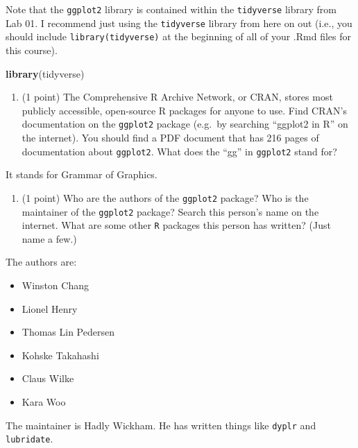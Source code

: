 \documentclass[]{article}
\newenvironment{Shaded}{\begin{snugshade}}{\end{snugshade}}
\newcommand{\KeywordTok}[1]{\textcolor[rgb]{0.13,0.29,0.53}{\textbf{#1}}}
\newcommand{\NormalTok}[1]{#1}
\providecommand{\tightlist}{%
  \setlength{\itemsep}{0pt}\setlength{\parskip}{0pt}}
\begin{document}
Note that the \texttt{ggplot2} library is contained within the
\texttt{tidyverse} library from Lab 01. I recommend just using the
\texttt{tidyverse} library from here on out (i.e., you should include
\texttt{library(tidyverse)} at the beginning of all of your .Rmd files
for this course).

\begin{Shaded}
\begin{Highlighting}[]
\KeywordTok{library}\NormalTok{(tidyverse)}
\end{Highlighting}
\end{Shaded}

\begin{enumerate}
\def\labelenumi{\alph{enumi}.}
\setcounter{enumi}{1}
\tightlist
\item
  (1 point) The Comprehensive R Archive Network, or CRAN, stores most
  publicly accessible, open-source R packages for anyone to use. Find
  CRAN's documentation on the \texttt{ggplot2} package (e.g.~by
  searching ``ggplot2 in R'' on the internet). You should find a PDF
  document that has 216 pages of documentation about \texttt{ggplot2}.
  What does the ``gg'' in \texttt{ggplot2} stand for?
\end{enumerate}

It stands for Grammar of Graphics.

\begin{enumerate}
\def\labelenumi{\alph{enumi}.}
\setcounter{enumi}{2}
\tightlist
\item
  (1 point) Who are the authors of the \texttt{ggplot2} package? Who is
  the maintainer of the \texttt{ggplot2} package? Search this person's
  name on the internet. What are some other \texttt{R} packages this
  person has written? (Just name a few.)
\end{enumerate}

The authors are:

\begin{itemize}
\tightlist
\item
  Winston Chang
\item
  Lionel Henry
\item
  Thomas Lin Pedersen
\item
  Kohske Takahashi
\item
  Claus Wilke
\item
  Kara Woo
\end{itemize}

The maintainer is Hadly Wickham. He has written things like
\texttt{dyplr} and \texttt{lubridate}.
\end{document}
